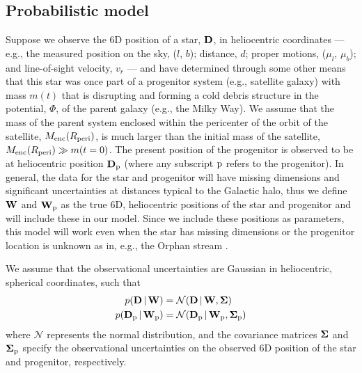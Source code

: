 \documentclass[letterpaper,12pt,preprint]{aastex}
\newcommand{\given}{\,|\,}
\newcommand{\D}{{\bf D}}
\newcommand{\W}{{\bf W}}
\newcommand{\bSigma}{{\bf \Sigma}}
\newcommand{\sat}{{\rm p}}
\begin{document}
\subsection{Probabilistic model}
Suppose we observe the 6D position of a star, $\D$, in heliocentric coordinates --- e.g., the measured position on the sky, ($l$, $b$); distance, $d$; proper motions, ($\mu_l$, $\mu_b$); and line-of-sight velocity, $v_r$ --- and have determined through some other means that this star was once part of a progenitor system (e.g., satellite galaxy) with mass $m(t)$ that is disrupting and forming a cold debris structure in the potential, $\Phi$, of the parent galaxy (e.g., the Milky Way). We assume that the mass of the parent system enclosed within the pericenter of the orbit of the satellite, $M_{\rm enc}(R_{\rm peri})$, is much larger than the initial mass of the satellite, $M_{\rm enc}(R_{\rm peri})\gg m(t=0)$. The present position of the progenitor is observed to be at heliocentric position $\D_\sat$ (where any subscript $\sat$ refers to the progenitor). In general, the data for the star and progenitor will have missing dimensions and significant uncertainties at distances typical to the Galactic halo, thus we define $\W$ and $\W_\sat$ as the true 6D, heliocentric positions of the star and progenitor and will include these in our model. Since we include these positions as parameters, this model will work even when the star has missing dimensions or the progenitor location is unknown as in, e.g., the Orphan stream \citep{belokurov07}.

We assume that the observational uncertainties are Gaussian in heliocentric, spherical coordinates, such that
\begin{align}
	p(\D \given \W) &= \mathcal{N}(\D \given \W, \bSigma)\label{eq:obsstar}\\
	p(\D_\sat \given \W_\sat) &= \mathcal{N}(\D_\sat \given \W_\sat, \bSigma_\sat)\label{eq:obsprog}
\end{align}
where $\mathcal{N}$ represents the normal distribution, and the covariance matrices $\bSigma$ and $\bSigma_\sat$ specify the observational uncertainties on the observed 6D position of the star and progenitor, respectively. 
\end{document}
